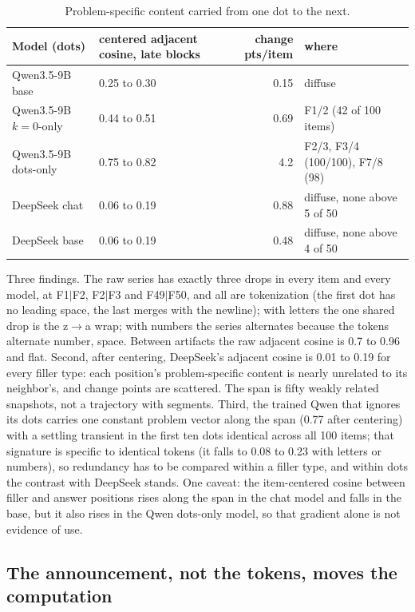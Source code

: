 \documentclass[11pt]{article}
\begin{document}
\begin{table}[h]\centering\footnotesize
\begin{tabular}{lp{2.6cm}rp{4.2cm}}\toprule
Model (dots) & centered adjacent cosine, late blocks & change pts/item & where \\ \midrule
Qwen3.5-9B base & 0.25 to 0.30 & 0.15 & diffuse \\
Qwen3.5-9B $k=0$-only & 0.44 to 0.51 & 0.69 & F1/2 (42 of 100 items) \\
Qwen3.5-9B dots-only & 0.75 to 0.82 & 4.2 & F2/3, F3/4 (100/100), F7/8 (98) \\
DeepSeek chat & 0.06 to 0.19 & 0.88 & diffuse, none above 5 of 50 \\
DeepSeek base & 0.06 to 0.19 & 0.48 & diffuse, none above 4 of 50 \\ \bottomrule
\end{tabular}
\caption{Problem-specific content carried from one dot to the next.}\end{table}

Three findings. The raw series has exactly three drops in every item and every model, at F1$|$F2, F2$|$F3 and F49$|$F50, and all are tokenization (the first dot has no leading space, the last merges with the newline); with letters the one shared drop is the z$\to$a wrap; with numbers the series alternates because the tokens alternate number, space. Between artifacts the raw adjacent cosine is 0.7 to 0.96 and flat. Second, after centering, DeepSeek's adjacent cosine is 0.01 to 0.19 for every filler type: each position's problem-specific content is nearly unrelated to its neighbor's, and change points are scattered. The span is fifty weakly related snapshots, not a trajectory with segments. Third, the trained Qwen that ignores its dots carries one constant problem vector along the span (0.77 after centering) with a settling transient in the first ten dots identical across all 100 items; that signature is specific to identical tokens (it falls to 0.08 to 0.23 with letters or numbers), so redundancy has to be compared within a filler type, and within dots the contrast with DeepSeek stands. One caveat: the item-centered cosine between filler and answer positions rises along the span in the chat model and falls in the base, but it also rises in the Qwen dots-only model, so that gradient alone is not evidence of use.

\subsection{The announcement, not the tokens, moves the computation}
\end{document}

